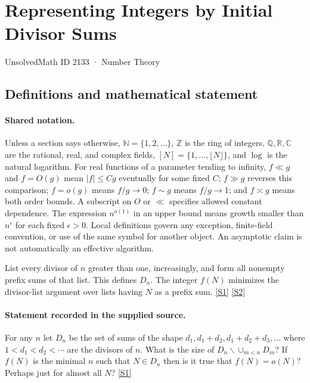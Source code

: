 \documentclass[11pt,a4paper]{article}
\newcommand{\N}{\mathbb{N}}
\newcommand{\Z}{\mathbb{Z}}
\newcommand{\Q}{\mathbb{Q}}
\newcommand{\R}{\mathbb{R}}
\newcommand{\C}{\mathbb{C}}
\newcommand{\sref}[2]{\hyperlink{source:#1:#2}{[S#2]}}
\begin{document}

\setcounter{section}{2132}

\section{Representing Integers by Initial Divisor Sums}\label{2133}

{\small\sffamily UnsolvedMath ID 2133 · Number Theory}

\subsection{Definitions and mathematical statement}

\paragraph{Shared notation.}Unless a section says otherwise, $\N=\{1,2,\ldots\}$,
$\Z$ is the ring of integers, $\Q,\R,\C$ are the rational, real, and complex
fields, $[N]=\{1,\ldots,\lfloor N\rfloor\}$, and $\log$ is the natural
logarithm. For real functions of a parameter tending to infinity,
$f\ll g$ and $f=O(g)$ mean $|f|\leq Cg$ eventually for some fixed $C$;
$f\gg g$ reverses this comparison; $f=o(g)$ means $f/g\to0$;
$f\sim g$ means $f/g\to1$; and $f\asymp g$ means both order bounds.
A subscript on $O$ or $\ll$ specifies allowed constant dependence.
The expression $n^{o(1)}$ in an upper bound means growth smaller than
$n^\epsilon$ for each fixed $\epsilon>0$. Local definitions govern any
exception, finite-field convention, or use of the same symbol for another
object. An asymptotic claim is not automatically an effective algorithm.



List every divisor of $n$ greater than one, increasingly, and form all nonempty prefix sums of that list. This defines $D_n$. The integer $f(N)$ minimizes the divisor-list argument over lists having $N$ as a prefix sum. \sref{2133}{1} \sref{2133}{2}

\paragraph{Statement recorded in the supplied source.}
For any $n$ let $D_n$ be the set of sums of the shape $d_1,d_1+d_2,d_1+d_2+d_3,\ldots$ where $1<d_1<d_2<\cdots$ are the divisors of $n$.
What is the size of $D_n\backslash \cup_{m<n}D_m$?
If $f(N)$ is the minimal $n$ such that $N\in D_n$ then is it true that $f(N)=o(N)$? Perhaps just for almost all $N$? \sref{2133}{1}
\end{document}
